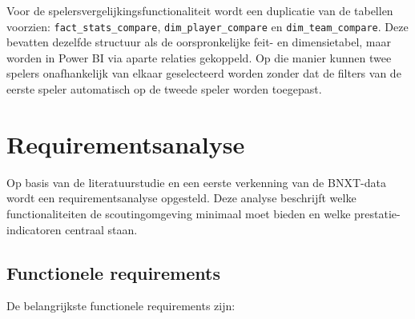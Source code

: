 Voor de spelersvergelijkingsfunctionaliteit wordt een duplicatie van de tabellen voorzien: \texttt{fact\_stats\_compare}, \texttt{dim\_player\_compare} en \texttt{dim\_team\_compare}. Deze bevatten dezelfde structuur als de oorspronkelijke feit- en dimensietabel, maar worden in Power BI via aparte relaties gekoppeld. Op die manier kunnen twee spelers onafhankelijk van elkaar geselecteerd worden zonder dat de filters van de eerste speler automatisch op de tweede speler worden toegepast.
\section{Requirementsanalyse}%
\label{sec:requirementsanalyse}

Op basis van de literatuurstudie en een eerste verkenning van de BNXT-data wordt een requirementsanalyse opgesteld. Deze analyse beschrijft welke functionaliteiten de scoutingomgeving minimaal moet bieden en welke prestatie-indicatoren centraal staan.

\subsection{Functionele requirements}

De belangrijkste functionele requirements zijn:

